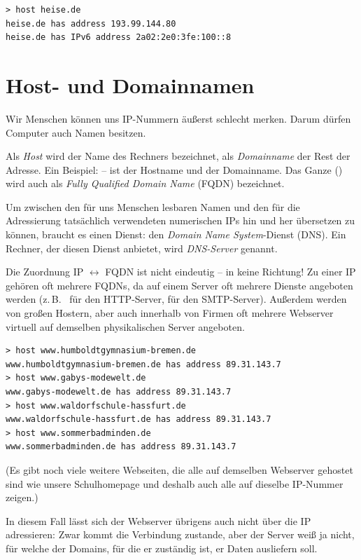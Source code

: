\begin{lstlisting}
> host heise.de
heise.de has address 193.99.144.80
heise.de has IPv6 address 2a02:2e0:3fe:100::8
\end{lstlisting}
 
\section{Host- und Domainnamen}

Wir Menschen können uns IP-Nummern äußerst schlecht merken. Darum dürfen
Computer auch Namen besitzen. 

Als \emph{Host} wird der Name des Rechners bezeichnet, als \emph{Domainname} der
Rest der Adresse. Ein Beispiel:  -- 
ist der Hostname und  der Domainname.
Das Ganze () wird auch als \emph{Fully Qualified Domain
Name} (FQDN) bezeichnet.

Um zwischen den für uns Menschen lesbaren Namen und den für die Adressierung
tatsächlich verwendeten numerischen IPs hin und her übersetzen zu können,
braucht es einen Dienst: den \emph{Domain Name System}-Dienst (DNS). Ein
Rechner, der diesen Dienst anbietet, wird \emph{DNS-Server} genannt.

Die Zuordnung IP $\leftrightarrow$ FQDN ist nicht eindeutig -- in keine Richtung!
Zu einer IP gehören oft mehrere FQDNs, da auf einem Server oft mehrere Dienste
angeboten werden (z.\,B.\  für den HTTP-Server,
 für den SMTP-Server). Außerdem werden von großen
Hostern, aber auch innerhalb von Firmen oft mehrere Webserver virtuell auf
demselben physikalischen Server angeboten. 

\begin{lstlisting}
> host www.humboldtgymnasium-bremen.de
www.humboldtgymnasium-bremen.de has address 89.31.143.7
> host www.gabys-modewelt.de
www.gabys-modewelt.de has address 89.31.143.7
> host www.waldorfschule-hassfurt.de
www.waldorfschule-hassfurt.de has address 89.31.143.7
> host www.sommerbadminden.de
www.sommerbadminden.de has address 89.31.143.7
\end{lstlisting}

(Es gibt noch viele weitere Webseiten, die alle auf demselben Webserver
gehostet sind wie unsere Schulhomepage und deshalb auch alle auf dieselbe
IP-Nummer zeigen.)

In diesem Fall lässt sich der Webserver übrigens auch nicht über die IP
adressieren: Zwar kommt die Verbindung zustande, aber der Server weiß ja nicht,
für welche der Domains, für die er zuständig ist, er Daten ausliefern soll.


